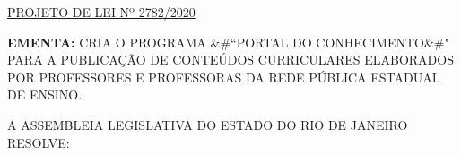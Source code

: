 \documentclass[10pt]{article}
\date{}
\begin{document}
\maketitle
\begin{center}
  \huge
  \vspace{-3cm}\href{http://alerjln1.alerj.rj.gov.br/scpro1923.nsf/f4b46b3cdbba990083256cc900746cf6/a578ac35ff03555d03258590000027b2?OpenDocument}{PROJETO DE LEI Nº 2782/2020}
\bigskip
\bigskip
\bigskip
  
\end{center}

\textbf{EMENTA:} 
CRIA O PROGRAMA &#``PORTAL DO CONHECIMENTO&#" PARA A PUBLICAÇÃO DE CONTEÚDOS CURRICULARES ELABORADOS POR PROFESSORES E PROFESSORAS DA REDE PÚBLICA ESTADUAL DE ENSINO.








\bigskip

\noindent
A ASSEMBLEIA LEGISLATIVA DO ESTADO DO RIO DE JANEIRO RESOLVE:
\end{document}
